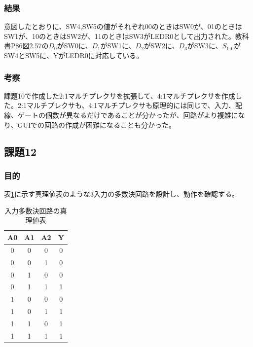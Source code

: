 \documentclass[a4paper]{jarticle}
\begin{document}
\subsubsection{結果}
意図したとおりに、SW4,SW5の値がそれぞれ00のときはSW0が、01のときはSW1が、10のときはSW2が、11のときはSW3がLEDR0として出力された。教科書P86図2.57の$D_0$がSW0に、$D_1$がSW1に、$D_2$がSW2に、$D_3$がSW3に、$S_{1:0}$がSW4とSW5に、YがLEDR0に対応している。
\subsubsection{考察}
課題10で作成した2:1マルチプレクサを拡張して、4:1マルチプレクサを作成した。2:1マルチプレクサも、4:1マルチプレクサも原理的には同じで、入力、配線、ゲートの個数が異なるだけであることが分かったが、回路がより複雑になり、GUIでの回路の作成が困難になることも分かった。
\subsection{課題12}
\subsubsection{目的}
表\ref{Report12TruthTable}に示す真理値表のような3入力の多数決回路を設計し、動作を確認する。
\begin{table}[ht]
	\begin{center}
		\caption{入力多数決回路の真理値表}
		\label{Report12TruthTable}
		\begin{tabular}{|c|c|c||c|}		\hline
			A0	&A1	&A2	&Y\\	\hline\hline
			0	&0	&0	&0\\	\hline
			0	&0	&1	&0\\	\hline
			0	&1	&0	&0\\	\hline
			0	&1	&1	&1\\	\hline
			1	&0	&0	&0\\	\hline
			1	&0	&1	&1\\	\hline
			1	&1	&0	&1\\	\hline
			1	&1	&1	&1\\	\hline
		\end{tabular}
	\end{center}
\end{table}
\end{document}
